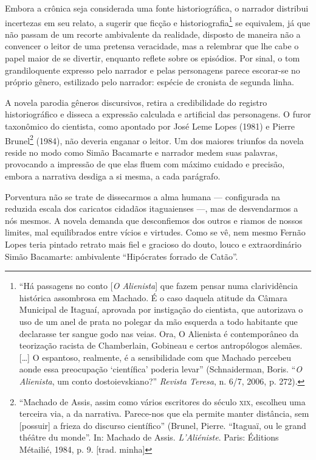 Embora a crônica seja considerada uma fonte historiográfica, o narrador
distribui incertezas em seu relato, a sugerir que ficção e
historiografia\footnote{``Há passagens no conto {[}\emph{O Alienista}{]}
  que fazem pensar numa clarividência histórica assombrosa em Machado. É
  o caso daquela atitude da Câmara Municipal de Itaguaí, aprovada por
  instigação do cientista, que autorizava o uso de um anel de prata no
  polegar da mão esquerda a todo habitante que declarasse ter sangue
  godo nas veias. Ora, O Alienista é contemporâneo da teorização racista
  de Chamberlain, Gobineau e certos antropólogos alemães. {[}\ldots{}{]}
  O espantoso, realmente, é a sensibilidade com que Machado percebeu
  aonde essa preocupação `científica' poderia levar'' (Schnaiderman,
  Boris. ``\emph{O Alienista}, um conto dostoievskiano?'' \emph{Revista
  Teresa}, n. 6/7, 2006, p. 272).} se equivalem, já que não passam de um
recorte ambivalente da realidade, disposto de maneira não a convencer o
leitor de uma pretensa veracidade, mas a relembrar que lhe cabe o papel
maior de se divertir, enquanto reflete sobre os episódios. Por sinal, o
tom grandiloquente expresso pelo narrador e pelas personagens parece
escorar-se no próprio gênero, estilizado pelo narrador: espécie de
cronista de segunda linha.

A novela parodia gêneros discursivos, retira a credibilidade do registro
historiográfico e disseca a expressão calculada e artificial das
personagens. O furor taxonômico do cientista, como apontado por José
Leme Lopes (1981) e Pierre Brunel\footnote{``Machado de Assis, assim
  como vários escritores do século \textsc{xix}, escolheu uma terceira via, a da
  narrativa. Parece-nos que ela permite manter distância, sem
  {[}possuir{]} a frieza do discurso científico'' (Brunel, Pierre.
  ``Itaguaï, ou le grand théâtre du monde''. In: Machado de Assis.
  \emph{L'Aliéniste}. Paris: Éditions Métailié, 1984, p. 9. [trad. minha]} (1984), não deveria enganar o leitor. Um dos maiores triunfos
da novela reside no modo como Simão Bacamarte e narrador medem suas
palavras, provocando a impressão de que elas fluem com máximo cuidado e
precisão, embora a narrativa desdiga a si mesma, a cada parágrafo.

Porventura não se trate de dissecarmos a alma humana --- configurada na
reduzida escala dos caricatos cidadãos itaguaienses ---, mas de
desvendarmos a nós mesmos. A novela demanda que desconfiemos dos outros
e riamos de nossos limites, mal equilibrados entre vícios e virtudes.
Como se vê, nem mesmo Fernão Lopes teria pintado retrato mais fiel e
gracioso do douto, louco e extraordinário Simão Bacamarte: ambivalente
``Hipócrates forrado de Catão''.

